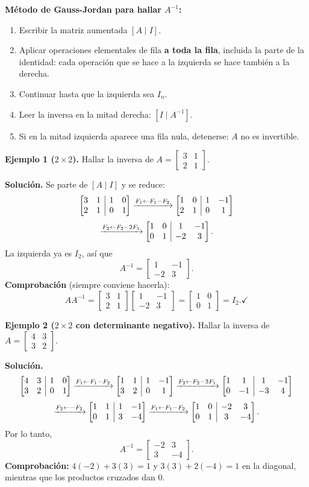 \documentclass[12pt, letterpaper]{article}
\makeatletter
\newcommand{\mwmat}[1]{\ensuremath{\begin{bmatrix}#1\end{bmatrix}}}
\newcommand{\mwaug}[2]{\ensuremath{\left[\begin{array}{@{}#1@{}}#2\end{array}\right]}}
\makeatother
\begin{document}
\begin{cuadropasos}
  \small
  \textbf{Método de Gauss-Jordan para hallar $A^{-1}$:}
  \begin{enumerate}[leftmargin=1.4em, nosep]
    \item Escribir la matriz aumentada $[A\mid I]$.
    \item Aplicar operaciones elementales de fila \textbf{a toda la fila},
          incluida la parte de la identidad: cada operación que se hace a la
          izquierda se hace también a la derecha.
    \item Continuar hasta que la izquierda sea $I_n$.
    \item Leer la inversa en la mitad derecha: $[I\mid A^{-1}]$.
    \item Si en la mitad izquierda aparece una fila nula, detenerse:
          $A$ no es invertible.
  \end{enumerate}
\end{cuadropasos}

\begin{cuadrosolucion}
  \small
  \textbf{Ejemplo 1 ($2\times2$).} Hallar la inversa de
  $A=\mwmat{3&1\\2&1}$.

  \medskip
  \textbf{Solución.} Se parte de $[A\mid I]$ y se reduce:
  \[
    \mwaug{cc|cc}{3&1&1&0\\2&1&0&1}
    \xrightarrow{F_1\leftarrow F_1-F_2}
    \mwaug{cc|cc}{1&0&1&-1\\2&1&0&1}
  \]
  \[
    \xrightarrow{F_2\leftarrow F_2-2F_1}
    \mwaug{cc|cc}{1&0&1&-1\\0&1&-2&3}.
  \]
  La izquierda ya es $I_2$, así que
  \[
    A^{-1}=\mwmat{1&-1\\-2&3}.
  \]
  \textbf{Comprobación} (siempre conviene hacerla):
  \[
    AA^{-1}=\mwmat{3&1\\2&1}\mwmat{1&-1\\-2&3}
    =\mwmat{1&0\\0&1}=I_2. \checkmark
  \]
\end{cuadrosolucion}

\begin{cuadrosolucion}
  \small
  \textbf{Ejemplo 2 ($2\times2$ con determinante negativo).} Hallar la inversa
  de $A=\mwmat{4&3\\3&2}$.

  \medskip
  \textbf{Solución.}
  \[
    \mwaug{cc|cc}{4&3&1&0\\3&2&0&1}
    \xrightarrow{F_1\leftarrow F_1-F_2}
    \mwaug{cc|cc}{1&1&1&-1\\3&2&0&1}
    \xrightarrow{F_2\leftarrow F_2-3F_1}
    \mwaug{cc|cc}{1&1&1&-1\\0&-1&-3&4}
  \]
  \[
    \xrightarrow{F_2\leftarrow -F_2}
    \mwaug{cc|cc}{1&1&1&-1\\0&1&3&-4}
    \xrightarrow{F_1\leftarrow F_1-F_2}
    \mwaug{cc|cc}{1&0&-2&3\\0&1&3&-4}.
  \]
  Por lo tanto,
  \[
    A^{-1}=\mwmat{-2&3\\3&-4}.
  \]
  \textbf{Comprobación:} $4(-2)+3(3)=1$ y $3(3)+2(-4)=1$ en la diagonal,
  mientras que los productos cruzados dan $0$. \checkmark
\end{cuadrosolucion}
\end{document}
